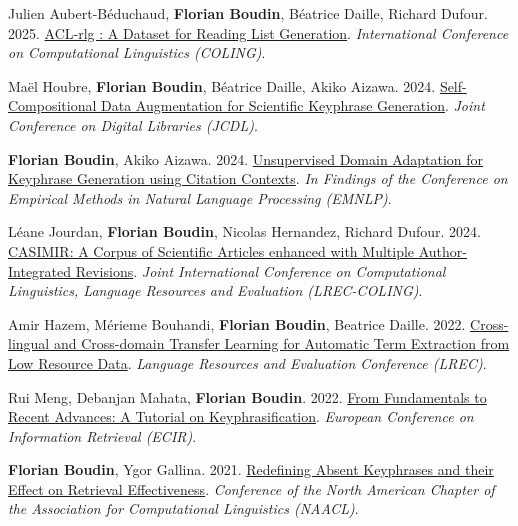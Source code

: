 \item 
Julien Aubert-Béduchaud, \textbf{Florian Boudin}, Béatrice Daille, Richard Dufour.
2025.
\href{https://aclanthology.org/2025.coling-main.327.pdf}{ACL-rlg : A Dataset for Reading List Generation}.
\textit{International Conference on Computational Linguistics (COLING)}.
\label{aubert-beduchaud-etal-2025-acl}

\item 
Maël Houbre, \textbf{Florian Boudin}, Béatrice Daille, Akiko Aizawa.
2024.
\href{https://arxiv.org/pdf/2411.03039}{Self-Compositional Data Augmentation for Scientific Keyphrase Generation}.
\textit{Joint Conference on Digital Libraries (JCDL)}.
\label{houbre-etal-2024-self}

\item
\textbf{Florian Boudin}, Akiko Aizawa.
2024.
\href{https://aclanthology.org/2024.findings-emnlp.33.pdf}{Unsupervised Domain Adaptation for Keyphrase Generation using Citation Contexts}.
\textit{In Findings of the Conference on Empirical Methods in Natural Language Processing (EMNLP)}.
\label{boudin-aizawa-2024-unsupervised}

\item 
Léane Jourdan, \textbf{Florian Boudin}, Nicolas Hernandez, Richard Dufour.
2024.
\href{https://aclanthology.org/2024.lrec-main.257.pdf}{CASIMIR: A Corpus of Scientific Articles enhanced with Multiple Author-Integrated Revisions}.
\textit{Joint International Conference on Computational Linguistics, Language Resources and Evaluation (LREC-COLING)}.
\label{jourdan-etal-2024-casimir}

\item
Amir Hazem, Mérieme Bouhandi, \textbf{Florian Boudin}, Beatrice Daille.
2022.
\href{https://aclanthology.org/2022.lrec-1.68.pdf}{Cross-lingual and Cross-domain Transfer Learning for Automatic Term Extraction from Low Resource Data}.
\textit{Language Resources and Evaluation Conference (LREC)}.
\label{hazem-etal-2022-cross}

\item
Rui Meng, Debanjan Mahata, \textbf{Florian Boudin}.
2022.
\href{https://link.springer.com/chapter/10.1007/978-3-030-99739-7_73}{From Fundamentals to Recent Advances: A Tutorial on Keyphrasification}.
\textit{European Conference on Information Retrieval (ECIR)}.
\label{meng-etal-2022-fundamentals}

\item 
\textbf{Florian Boudin}, Ygor Gallina.
2021.
\href{https://www.aclweb.org/anthology/2021.naacl-main.330.pdf}{Redefining Absent Keyphrases and their Effect on Retrieval Effectiveness}.
\textit{Conference of the North American Chapter of the Association for Computational Linguistics (NAACL)}.
\label{boudin-gallina-2021-redefining}

